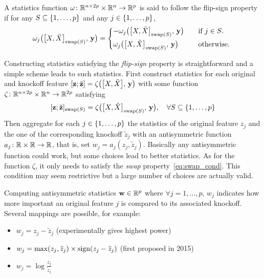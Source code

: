 \begin{definition}
A statistics function $\omega \colon \mathbb{R}^{n \times 2p} \times \mathbb{R}^n \to \mathbb{R}^p$
is said to follow the flip-sign property if for any $S \subseteq \left\{ 1, \dots, p \right\}$ and any $j \in \left\{ 1, \dots, p \right\}$,
\begin{equation*}
        \omega_j\big( \big[ X, \tX \big]_{\swap(S)},\, \yy \big) = \begin{cases*}
                -\omega_j\big( \big[ X, \tX \big]_{\swap(S)},\, \yy \big) &\quad\text{if $j \in S$.}\\
                \omega_j\big( \big[ X, \tX \big]_{\swap(S)},\, \yy \big) &\quad\text{otherwise.}
        \end{cases*}
\end{equation*}
\end{definition}
Constructing statistics satisfying the \emph{flip-sign} property is straightforward and a simple scheme leads to such
statistics.
First construct statistics for each original and knockoff feature
$[ \mathbf{z} ; \tilde{\mathbf{z}} ] = \zeta\big( \big[ X, \tilde{X} \big],\, \mathbf{y} \big)$
with some function $\zeta \colon \mathbb{R}^{n \times 2p} \times \mathbb{R}^n \to \mathbb{R}^{2p}$ satisfying
\begin{equation}\label{eq:swap_cond}
        [ \mathbf{z} ; \tilde{\mathbf{z}} ]_{\operatorname{swap}(S)} = \zeta\big( \big[ X, \tilde{X} \big]_{\operatorname{swap}(S)},\, \mathbf{y} \big)
        ,\quad
        \forall S \subseteq \left\{ 1, \dots, p \right\}
\end{equation}
Then aggregate for each $j \in \left\{ 1, \dots, p \right\}$ the statistics of the original feature $z_j$ and the one of the corresponding
knockoff $\tilde{z}_j$ with an antisymmetric function $a_j \colon \mathbb{R}\times\mathbb{R} \to \mathbb{R}$,
that is, set $w_j = a_j(z_j, \tilde{z}_j)$.
Basically any antisymmetric function could work, but some choices lead to better statistics.
As for the function $\zeta$, it only needs to satisfy the \emph{swap} property~\ref{eq:swap_cond}.
This condition may seem restrictive but a large number of choices are actually valid.

Computing antisymmetric statistics $\mathbf{w} \in \mathbb{R}^p$ where $\forall j = 1, \dots, p$, $w_j$
indicates how more important an original feature $j$ is compared to its associated knockoff.
Several mappings are possible, for example:
\begin{itemize}
        \item $w_j = z_j - \tilde{z}_j$ (experimentally gives highest power)
        \item $w_j = \max(z_j, \tilde{z}_j) \times \operatorname*{sign}(z_j - \tilde{z}_j)$ (first proposed in 2015)
        \item $w_j = \log\frac{z_j}{\tilde{z}_j}$
\end{itemize}

